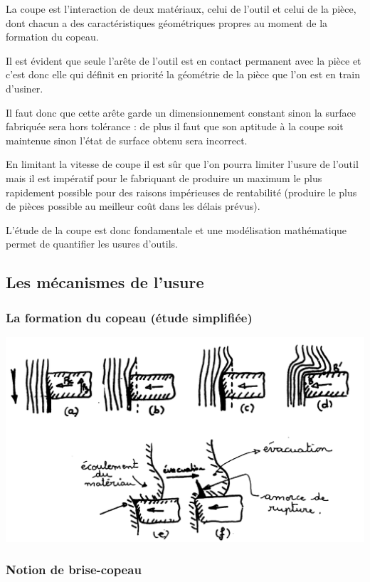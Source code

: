 \documentclass[11pt,oneside]{article}
\begin{document}
La coupe est l'interaction de deux matériaux, celui de l'outil et celui de la pièce, dont chacun a des caractéristiques géométriques propres au moment de la formation du copeau.
	
Il est évident que seule l'arête de l'outil est en contact permanent avec la pièce et c'est donc elle qui définit en priorité la géométrie de la pièce que l'on est en train d'usiner.
	
Il faut donc que cette arête garde un dimensionnement constant sinon la surface fabriquée sera hors tolérance : de plus il faut que son aptitude à la coupe soit maintenue sinon l'état de surface obtenu sera incorrect.

En limitant  la vitesse de coupe il est sûr que l'on pourra limiter l'usure de l'outil mais il est impératif pour le fabriquant de produire un maximum le plus rapidement possible pour des raisons impérieuses de rentabilité (produire le plus de pièces possible au meilleur coût dans les délais prévus).
	
L'étude de la coupe est donc fondamentale et une modélisation mathématique permet de quantifier les usures d'outils. 

\subsection{Les mécanismes de l'usure}
\subsubsection{La formation du copeau (étude simplifiée)}

\begin{center}
\includegraphics[width=.75\textwidth]{png/fig_04}
\end{center}

\subsubsection{Notion de brise-copeau}
\end{document}
